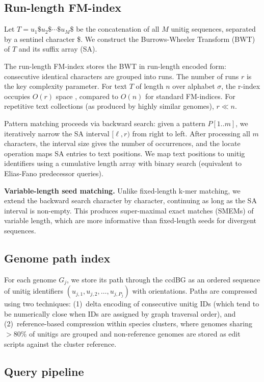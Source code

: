 \documentclass[11pt]{article}
\begin{document}
\subsection{Run-length FM-index}

Let $T = u_1 \$ u_2 \$ \cdots \$ u_M \$$ be the concatenation of all $M$ unitig sequences, separated by a sentinel character \$. We construct the Burrows-Wheeler Transform (BWT) of $T$ and its suffix array (SA).

The run-length FM-index stores the BWT in run-length encoded form: consecutive identical characters are grouped into runs. The number of runs $r$ is the key complexity parameter. For text $T$ of length $n$ over alphabet $\sigma$, the r-index occupies $O(r)$ space \citep{gagie2020fully}, compared to $O(n)$ for standard FM-indices. For repetitive text collections (as produced by highly similar genomes), $r \ll n$.

Pattern matching proceeds via backward search: given a pattern $P[1..m]$, we iteratively narrow the SA interval $[\ell, r)$ from right to left. After processing all $m$ characters, the interval size gives the number of occurrences, and the locate operation maps SA entries to text positions. We map text positions to unitig identifiers using a cumulative length array with binary search (equivalent to Elias-Fano predecessor queries).

\textbf{Variable-length seed matching.} Unlike fixed-length k-mer matching, we extend the backward search character by character, continuing as long as the SA interval is non-empty. This produces super-maximal exact matches (SMEMs) of variable length, which are more informative than fixed-length seeds for divergent sequences.

\subsection{Genome path index}

For each genome $G_j$, we store its path through the ccdBG as an ordered sequence of unitig identifiers $(u_{j,1}, u_{j,2}, \ldots, u_{j,P_j})$ with orientations. Paths are compressed using two techniques: (1)~delta encoding of consecutive unitig IDs (which tend to be numerically close when IDs are assigned by graph traversal order), and (2)~reference-based compression within species clusters, where genomes sharing $>$80\% of unitigs are grouped and non-reference genomes are stored as edit scripts against the cluster reference.

\subsection{Query pipeline}
\end{document}
